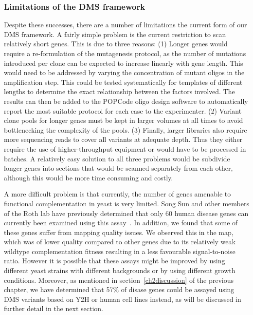 \subsubsection{Limitations of the DMS framework}
Despite these successes, there are a number of limitations the current form of our DMS framework. A fairly simple problem is the current restriction to scan relatively short genes. This is due to three reasons: (1) Longer genes would require a re-formulation of the mutagenesis protocol, as the number of mutations introduced per clone can be expected to increase linearly with gene length. This would need to be addressed by varying the concentration of mutant oligos in the amplification step. This could be tested systematically for templates of different lengths to determine the exact relationship between the factors involved. The results can then be added to the POPCode oligo design software to automatically report the most suitable protocol for each case to the experimenter.
(2) Variant clone pools for longer genes must be kept in larger volumes at all times to avoid bottlenecking the complexity of the pools.
(3) Finally, larger libraries also require more sequencing reads to cover all variants at adequate depth. Thus they either require the use of higher-throughput equipment or would have to be processed in batches. 
A relatively easy solution to all three problems would be subdivide longer genes into sections that would be scanned separately from each other, although this would be more time consuming and costly.

A more difficult problem is that currently, the number of genes amenable to functional complementation in yeast is very limited. Song Sun and other members of the Roth lab have previously determined that only 60 human disease genes can currently been examined using this assay~\cite{sun_extended_2016}. In addition, we found that some of these genes suffer from mapping quality issues. We observed this in the  map, which was of lower quality compared to other genes due to its relatively weak wildtype complementation fitness resulting in a less favourable signal-to-noise ratio. However it is possible that these assays might be improved by using different yeast strains with different backgrounds or by using different growth conditions.
Moreover, as mentioned in section~\ref{ch2discussion} of the previous chapter, we have determined that 57\% of disase genes could be assayed using DMS variants based on Y2H or human cell lines instead, as will be discussed in further detail in the next section.


